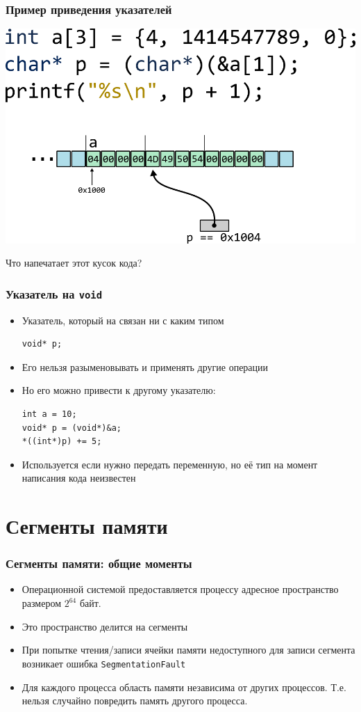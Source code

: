 \documentclass[10pt,pdf,hyperref={unicode}]{beamer}
\begin{document}
\begin{frame}[fragile]
\frametitle{Пример приведения указателей}
\begin{center}
\includegraphics[width=0.86\linewidth]{../images/pointer_arithmetics/parithmetics_8_pointer_addition_and_casting.png}
\end{center}
Что напечатает этот кусок кода?
\end{frame}


\begin{frame}[fragile]
\frametitle{Указатель на \texttt{void}}
\begin{itemize}
\item Указатель, который на связан ни с каким типом
\begin{lstlisting}
void* p;
\end{lstlisting}
\item Его нельзя разыменовывать и применять другие операции
\item Но его можно привести к другому указателю:
\begin{lstlisting}
int a = 10;
void* p = (void*)&a;
*((int*)p) += 5;
\end{lstlisting}
\item Используется если нужно передать переменную, но её тип на момент написания кода неизвестен
\end{itemize}
\end{frame}

\section{Сегменты памяти}

\begin{frame}[fragile]
\frametitle{Сегменты памяти: общие моменты}
\begin{itemize}
\item Операционной системой предоставляется процессу адресное пространство
размером $2^{64}$ байт.
\item Это пространство делится на сегменты
\item При попытке чтения/записи ячейки памяти недоступного для записи сегмента
возникает ошибка \texttt{SegmentationFault}
\item Для каждого процесса область памяти независима от других процессов. 
Т.е. нельзя случайно повредить память другого процесса.
\end{itemize}
\end{frame}
\end{document}
